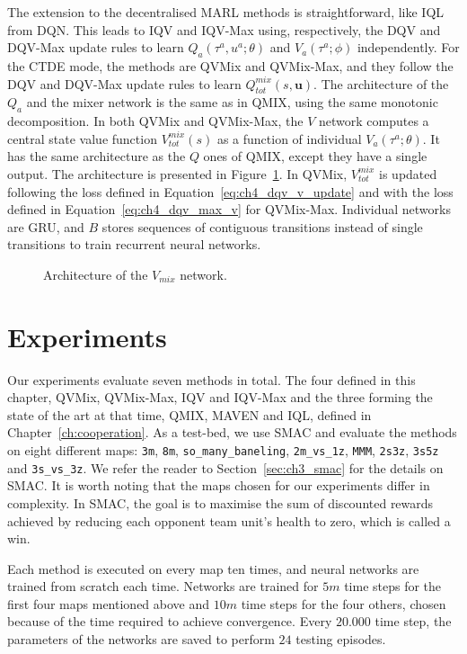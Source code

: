 The extension to the decentralised MARL methods is straightforward, like IQL from DQN.
This leads to IQV and IQV-Max using, respectively, the DQV and DQV-Max update rules to learn $Q_a(\tau^a, u^a;\theta)$ and $V_a(\tau^a;\phi)$ independently.
For the CTDE mode, the methods are QVMix and QVMix-Max, and they follow the DQV and DQV-Max update rules to learn $Q^{mix}_{tot}(s, \mathbf{u})$.
The architecture of the $Q_a$ and the mixer network is the same as in QMIX, using the same monotonic decomposition.
In both QVMix and QVMix-Max, the $V$ network computes a central state value function $V^{mix}_{tot}(s)$ as a function of individual $V_a(\tau^a;\theta)$.
It has the same architecture as the $Q$ ones of QMIX, except they have a single output. 
The architecture is presented in Figure~\ref{fig:ch4_qvmix}.
In QVMix, $V^{mix}_{tot}$ is updated following the loss defined in Equation~\ref{eq:ch4_dqv_v_update} and with the loss defined in Equation~\ref{eq:ch4_dqv_max_v} for QVMix-Max.
Individual networks are GRU, and $B$ stores sequences of contiguous transitions instead of single transitions to train recurrent neural networks.

\begin{figure}
\centering

\caption{Architecture of the $V_{mix}$ network.}
\label{fig:ch4_qvmix}
\end{figure}



\section{Experiments} \label{sec:ch4_experiments}

Our experiments evaluate seven methods in total.
The four defined in this chapter, QVMix, QVMix-Max, IQV and IQV-Max and the three forming the state of the art at that time, QMIX, MAVEN and IQL, defined in Chapter~\ref{ch:cooperation}.
As a test-bed, we use SMAC and evaluate the methods on eight different maps: \texttt{3m}, \texttt{8m}, \texttt{so\_many\_baneling}, \texttt{2m\_vs\_1z}, \texttt{MMM}, \texttt{2s3z}, \texttt{3s5z} and \texttt{3s\_vs\_3z}. 
We refer the reader to Section~\ref{sec:ch3_smac} for the details on SMAC.
It is worth noting that the maps chosen for our experiments differ in complexity. 
In SMAC, the goal is to maximise the sum of discounted rewards achieved by reducing each opponent team unit's health to zero, which is called a win.

Each method is executed on every map ten times, and neural networks are trained from scratch each time.
Networks are trained for $5m$ time steps for the first four maps mentioned above and $10m$ time steps for the four others, chosen because of the time required to achieve convergence.
Every $20.000$ time step, the parameters of the networks are saved to perform $24$ testing episodes.

